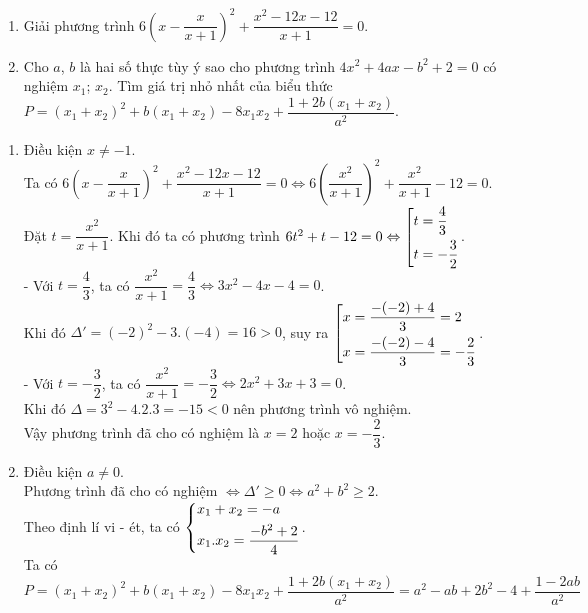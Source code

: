 \begin{ex}%
 \hfill
    \begin{enumerate}
        \item Giải phương trình $6\left(x - \dfrac{x}{x + 1}\right)^2 + \dfrac{x^2 - 12x - 12}{x + 1} = 0$.
        \item Cho $a$, $b$ là hai số thực tùy ý sao cho phương trình $4x^2 + 4ax - b^2 + 2 = 0$ có nghiệm $x_1$; $x_2$. Tìm giá trị nhỏ nhất của biểu thức $P = (x_1 + x_2)^2 + b(x_1 + x_2) - 8x_1x_2 + \dfrac{1 + 2b(x_1 + x_2)}{a^2}$.
    \end{enumerate}
\loigiai
    {
   \begin{enumerate}
   \item Điều kiện $x \neq -1$.\\
   Ta có $6\left(x - \dfrac{x}{x + 1}\right)^2 + \dfrac{x^2 - 12x - 12}{x + 1} = 0 \Leftrightarrow 6\left(\dfrac{x^2}{x + 1}\right)^2 + \dfrac{x^2}{x + 1} - 12 = 0$.\\
   Đặt $t = \dfrac{x^2}{x + 1}$. Khi đó ta có phương trình $6t^2 + t - 12 = 0 \Leftrightarrow \left[\begin{aligned}& t = \dfrac{4}{3} \\& t = -\dfrac{3}{2}\end{aligned}\right.$.\\
   - Với $t = \dfrac{4}{3}$, ta có $\dfrac{x^2}{x + 1} = \dfrac{4}{3} \Leftrightarrow 3x^2 - 4x - 4 = 0$.\\
   Khi đó $\Delta' = (-2)^2 - 3.(-4) = 16 > 0$, suy ra $\left[\begin{aligned}& x = \dfrac{-(-2) + 4}{3} = 2 \\& x = \dfrac{-(-2) - 4}{3} = -\dfrac{2}{3}\end{aligned}\right.$.\\
   - Với $t = -\dfrac{3}{2}$, ta có $\dfrac{x^2}{x + 1} = -\dfrac{3}{2} \Leftrightarrow 2x^2 + 3x + 3 = 0$.\\
   Khi đó $\Delta = 3^2 - 4.2.3 = -15 < 0$ nên phương trình vô nghiệm.\\
   Vậy phương trình đã cho có nghiệm là $x = 2$ hoặc $x = -\dfrac{2}{3}$.
   \item Điều kiện $a \neq 0$.\\
   Phương trình đã cho có nghiệm $\Leftrightarrow \Delta' \geq 0 \Leftrightarrow a^2 + b^2 \geq 2$.\\
   Theo định lí vi - ét, ta có $\left\{\begin{aligned}& x_1 + x_2 = -a\\& x_1.x_2 = \dfrac{-b^2 + 2}{4}\end{aligned}\right.$.\\
   Ta có $P = (x_1 + x_2)^2 + b(x_1 + x_2) - 8x_1x_2 + \dfrac{1 + 2b(x_1 + x_2)}{a^2} = a^2 - ab + 2b^2 - 4 + \dfrac{1 - 2ab}{a^2}$
   

\end{enumerate}}
\end{ex}
